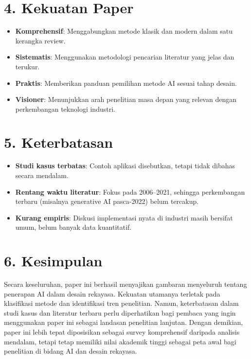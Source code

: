 \documentclass{article}
\begin{document}
\section*{4. Kekuatan Paper}
\begin{itemize}
    \item \textbf{Komprehensif}: Menggabungkan metode klasik dan modern dalam satu kerangka review.
    \item \textbf{Sistematis}: Menggunakan metodologi pencarian literatur yang jelas dan terukur.
    \item \textbf{Praktis}: Memberikan panduan pemilihan metode AI sesuai tahap desain.
    \item \textbf{Visioner}: Menunjukkan arah penelitian masa depan yang relevan dengan perkembangan teknologi industri.
\end{itemize}

\section*{5. Keterbatasan}
\begin{itemize}
    \item \textbf{Studi kasus terbatas}: Contoh aplikasi disebutkan, tetapi tidak dibahas secara mendalam.
    \item \textbf{Rentang waktu literatur}: Fokus pada 2006–2021, sehingga perkembangan terbaru (misalnya generative AI pasca-2022) belum tercakup.
    \item \textbf{Kurang empiris}: Diskusi implementasi nyata di industri masih bersifat umum, belum banyak data kuantitatif.
\end{itemize}

\section*{6. Kesimpulan}
Secara keseluruhan, paper ini berhasil menyajikan gambaran menyeluruh tentang penerapan AI dalam desain rekayasa. Kekuatan utamanya terletak pada klasifikasi metode dan identifikasi tren penelitian. Namun, keterbatasan dalam studi kasus dan literatur terbaru perlu diperhatikan bagi pembaca yang ingin menggunakan paper ini sebagai landasan penelitian lanjutan. Dengan demikian, paper ini lebih tepat diposisikan sebagai survey komprehensif daripada analisis mendalam, tetapi tetap memiliki nilai akademik tinggi sebagai peta awal bagi penelitian di bidang AI dan desain rekayasa.

\end{document}
